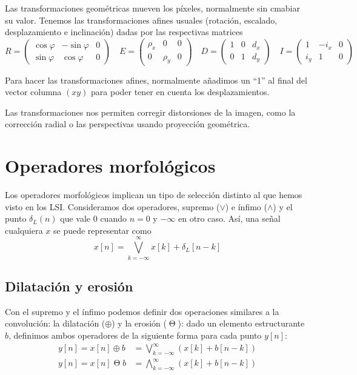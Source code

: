 \documentclass[nochap,palatino,notitlepage]{apuntes}
\DeclareMathOperator{\erd}{\Theta}
\begin{document}
Las transformaciones geométricas mueven los píxeles, normalmente sin cmabiar su valor. Tenemos las transformaciones afines usuales (rotación, escalado, desplazamiento e inclinación) dadas por las respectivas matrices \[
R = \begin{pmatrix} \cos φ & - \sin φ & 0 \\ \sin φ & \cos φ & 0 \end{pmatrix}\quad
E = \begin{pmatrix} ρ_x & 0 & 0 \\ 0 & ρ_y & 0 \end{pmatrix} \quad
D = \begin{pmatrix} 1 & 0 & d_x \\ 0 &  1 & d_y \end{pmatrix} \quad
I = \begin{pmatrix} 1 & -i_x & 0 \\ i_y &  1 & 0 \end{pmatrix} \quad
\]

Para hacer las transformaciones afines, normalmente añadimos un ``1'' al final del vector columna $(x y)$ para poder tener en cuenta los desplazamientos.

Las transformaciones nos permiten corregir distorsiones de la imagen, como la corrección radial o las perspectivas usando proyección geométrica.

\section{Operadores morfológicos}


Los operadores morfológicos implican un tipo de selección distinto al que hemos visto en los LSI. Consideramos dos operadores, supremo ($\vee$) e ínfimo ($\wedge$) y el punto $δ_L(n)$ que vale $0$ cuando $n = 0$ y $- ∞$ en otro caso. Así, una señal cualquiera $x$ se puede representar como \[ x[n] = \bigvee_{k=-∞}^∞ x[k] + δ_L[n-k]\]

\subsection{Dilatación y erosión}

Con el supremo y el ínfimo podemos definir dos operaciones similares a la convolución: la dilatación ($\oplus$) y la erosión ($\erd$): dado un elemento estructurante $b$, definimos ambos operadores de la siguiente forma para cada punto $y[n]$: \begin{align*}
y[n] = x[n] \oplus b &= \bigvee_{k=-∞}^∞ (x[k] + b[n-k]) \\
y[n] = x[n] \erd b &= \bigwedge_{k=-∞}^∞ (x[k] + b[n-k])
\end{align*}
\end{document}
